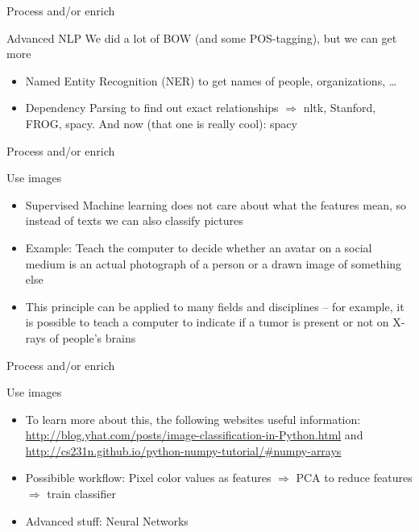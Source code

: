 \documentclass{beamer}
\begin{document}
\begin{frame}{Process and/or enrich}
	\begin{block}{Advanced NLP}
		We did a lot of BOW (and some POS-tagging), but we can get more
		\begin{itemize}
			\item Named Entity Recognition (NER) to get names of people, organizations, \ldots
			\item Dependency Parsing to find out exact relationships
			$\Rightarrow$ nltk, Stanford, FROG, spacy. And now (that one is really cool): spacy
		\end{itemize}
	\end{block}
\end{frame}



\begin{frame}{Process and/or enrich}
\begin{block}{Use images}
\begin{itemize}
	\item  Supervised Machine learning does not care about what the features mean, so instead of texts we can also classify pictures
	\item  Example: Teach the computer to decide whether an avatar on a social medium is an actual photograph of a person or a drawn image of something else
	\item  This principle can be applied to many fields and disciplines -- for example, it is possible to teach a computer to indicate if a tumor is present or not on X-rays of people's brains
\end{itemize}
\end{block}
\end{frame}


\begin{frame}{Process and/or enrich}
	\begin{block}{Use images}
		\begin{itemize}
	\item To learn more about this, the following websites useful information: \url{http://blog.yhat.com/posts/image-classification-in-Python.html} and \url {http://cs231n.github.io/python-numpy-tutorial/\#numpy-arrays}
	\item Possibible workflow: Pixel color values as features $\Rightarrow$ PCA to reduce features  $\Rightarrow$ train classifier
	\item Advanced stuff: Neural Networks
\end{itemize}
	\end{block}
\end{frame}
\end{document}

